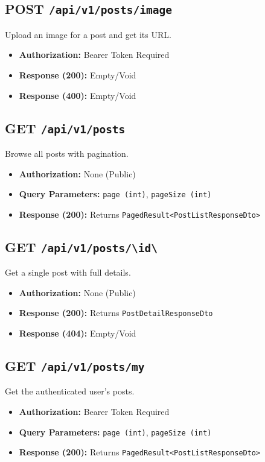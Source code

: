 \subsection{POST \texttt{/api/v1/posts/image}}
Upload an image for a post and get its URL.
\begin{itemize}
    \item \textbf{Authorization:} Bearer Token Required
    \item \textbf{Response (200):} Empty/Void
    \item \textbf{Response (400):} Empty/Void
\end{itemize}

\subsection{GET \texttt{/api/v1/posts}}
Browse all posts with pagination.
\begin{itemize}
    \item \textbf{Authorization:} None (Public)
    \item \textbf{Query Parameters:} \texttt{page (int)}, \texttt{pageSize (int)}
    \item \textbf{Response (200):} Returns \texttt{PagedResult<PostListResponseDto>}
\end{itemize}

\subsection{GET \texttt{/api/v1/posts/\textbackslash{}{id\textbackslash{}}}}
Get a single post with full details.
\begin{itemize}
    \item \textbf{Authorization:} None (Public)
    \item \textbf{Response (200):} Returns \texttt{PostDetailResponseDto}
    \item \textbf{Response (404):} Empty/Void
\end{itemize}

\subsection{GET \texttt{/api/v1/posts/my}}
Get the authenticated user's posts.
\begin{itemize}
    \item \textbf{Authorization:} Bearer Token Required
    \item \textbf{Query Parameters:} \texttt{page (int)}, \texttt{pageSize (int)}
    \item \textbf{Response (200):} Returns \texttt{PagedResult<PostListResponseDto>}
\end{itemize}

